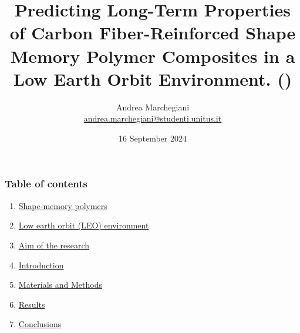 \documentclass[10pt]{beamer}
\begin{document}
\title[CF-SMPCs]{Predicting Long-Term
Properties of Carbon Fiber-Reinforced Shape Memory Polymer
Composites in a Low Earth Orbit Environment. {\tiny (\cite{polym13101628})}}


\author[Andrea Marchegiani]{Andrea Marchegiani \\
\href{mailto:andrea.marchegiani@studenti.unitus.it}{ andrea.marchegiani@studenti.unitus.it}}







\date{16 September 2024}
\begin{frame}[plain]
\maketitle
\end{frame}



\begin{frame}
\frametitle{Table of contents}
\begin{enumerate}
\item \hyperlink{memory}{Shape-memory polymers}
\item \hyperlink{LEO}{Low earth orbit (LEO) environment}
\item \hyperlink{aim}{Aim of the research}
\item \hyperlink{introduction}{Introduction}			
\item \hyperlink{mm}{Materials and Methods}
\item \hyperlink{results}{Results}
\item \hyperlink{conclusions}{Conclusions}
\end{enumerate}
\end{frame}
\end{document}
